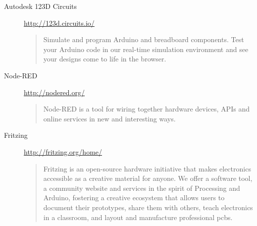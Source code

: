 \begin{description}
    \item[Autodesk 123D Circuits] \hfill \url{http://123d.circuits.io/} \\
        \begin{verse}
            Simulate and program Arduino and breadboard components.
            Test your Arduino code in our real-time simulation environment and see your designs come to life in the browser.
        \end{verse}
    \item[Node-RED] \hfill \url{http://nodered.org/} \\
        \begin{verse}
            Node-RED is a tool for wiring together hardware devices, APIs and online services in new and interesting ways.
        \end{verse}
    \item[Fritzing] \hfill \url{http://fritzing.org/home/} \\
        \begin{verse}
            Fritzing is an open-source hardware initiative that makes electronics accessible as a creative material for anyone. We offer a software tool, a community website and services in the spirit of Processing and Arduino, fostering a creative ecosystem that allows users to document their prototypes, share them with others, teach electronics in a classroom, and layout and manufacture professional pcbs.
        \end{verse}
\end{description}
